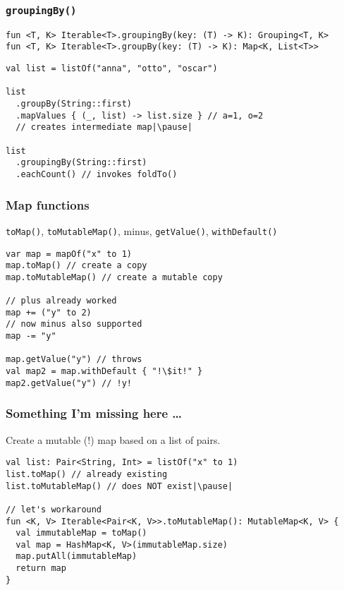 \begin{frame}[fragile] \frametitle{\texttt{groupingBy()}}
\footnotesize{\texttt{fun <T, K> Iterable<T>.groupingBy(key: (T) -> K): Grouping<T, K>}} \\
\footnotesize{\texttt{fun <T, K> Iterable<T>.groupBy(key: (T) -> K): Map<K, List<T>>}}
\begin{lstlisting}
val list = listOf("anna", "otto", "oscar")

list
  .groupBy(String::first)
  .mapValues { (_, list) -> list.size } // a=1, o=2
  // creates intermediate map|\pause|

list
  .groupingBy(String::first)
  .eachCount() // invokes foldTo()
\end{lstlisting}
\end{frame}

\begin{frame}[fragile] \frametitle{Map functions}
\texttt{toMap()}, \texttt{toMutableMap()}, minus, \texttt{getValue()}, \texttt{withDefault()}
\begin{lstlisting}
var map = mapOf("x" to 1)
map.toMap() // create a copy
map.toMutableMap() // create a mutable copy

// plus already worked
map += ("y" to 2)
// now minus also supported
map -= "y"

map.getValue("y") // throws
val map2 = map.withDefault { "!\$it!" }
map2.getValue("y") // !y!
\end{lstlisting}
\end{frame}

\begin{frame}[fragile] \frametitle{Something I'm missing here \ldots}
Create a mutable (!) map based on a list of pairs.
\begin{lstlisting}
val list: Pair<String, Int> = listOf("x" to 1)
list.toMap() // already existing
list.toMutableMap() // does NOT exist|\pause|

// let's workaround
fun <K, V> Iterable<Pair<K, V>>.toMutableMap(): MutableMap<K, V> {
  val immutableMap = toMap()
  val map = HashMap<K, V>(immutableMap.size)
  map.putAll(immutableMap)
  return map
}
\end{lstlisting}
\end{frame}

